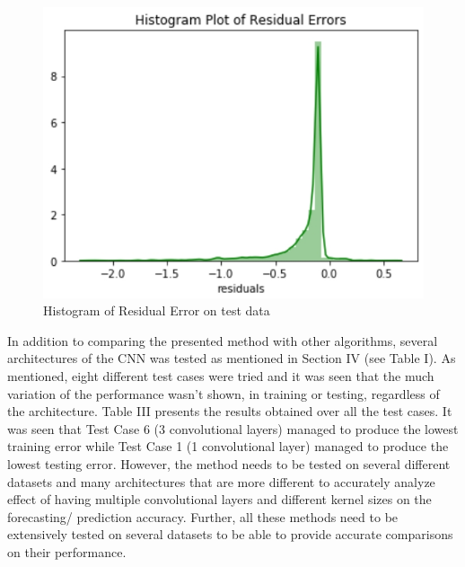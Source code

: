 \documentclass[twocolumn, a4paper,10pt]{article}
\begin{document}
\begin{figure}[ht]
    \centering
    \includegraphics[scale=0.45]{img/re_error.jpg}
    \caption{Histogram of Residual Error on test data}
    \label{fig:re_error}
\end{figure}

In addition to comparing the presented method with other algorithms, several architectures of the CNN was tested as mentioned in Section IV (see Table I). As mentioned, eight different test cases were tried and it was seen that the much variation of the performance wasn’t shown, in training or testing, regardless of the architecture. Table III presents the results obtained over all the test cases. It was seen that Test Case 6 (3 convolutional layers) managed to produce the lowest training error while Test Case 1 (1 convolutional layer) managed to produce the lowest testing error. However, the method needs to be tested on several different datasets and many architectures that are more different to accurately analyze effect of having multiple convolutional layers and different kernel sizes on the forecasting/ prediction accuracy. Further, all these methods need to be extensively tested on several datasets to be able to provide accurate comparisons on their performance.
\end{document}
